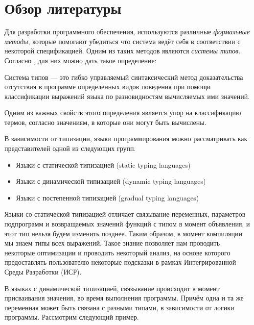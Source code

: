 \section{Обзор литературы}

Для разработки программного обеспечения, используются различные \textit{формальные методы}, которые помогают убедиться что система ведёт себя в соответствии с некоторой спецификацией. Одним из таких методов являются \textit{системы типов}. Согласно \cite{book:pierce2002types}, для них можно дать такое определение:


\begin{definition}
Система типов --- это гибко управляемый синтаксический метод доказательства отсутствия в программе определенных видов поведения при помощи классификации выражений языка по разновидностям вычисляемых ими значений.
\end{definition}

Одним из важных свойств этого определения является упор на классификацию термов, согласно значениям, в которые они могут быть вычислены.

В зависимости от типизации, языки программирования можно рассматривать как представителей одной из следующих групп.
\begin{itemize}
\itemsep-1mm
\item Языки с статической типизацией (static typing languages)
\item Языки с динамической типизацией (dynamic typing languages)
\item Языки с постепенной типизацией (gradual typing  languages)
\end{itemize}



Языки со статической типизацией отличает связывание переменных, параметров подпрограмм и возвращаемых значений функций с типом в момент объявления, и этот тип нельзя будем изменить позднее. Таким образом, в момент компиляции мы знаем типы всех выражений. Такое знание позволяет нам проводить некоторые оптимизации и проводить некоторый анализ, на основе которого предоставлять пользователю некоторые подсказки в рамках Интегрированной Среды Разработки (ИСР).

В языках с динамической типизацией, связывание происходит в момент присваивания  значения, во время выполнения программы. Причём одна и та же переменная может быть связана с разными типами, в зависимости от логики программы. Рассмотрим следующий пример.

\vskip4pt

